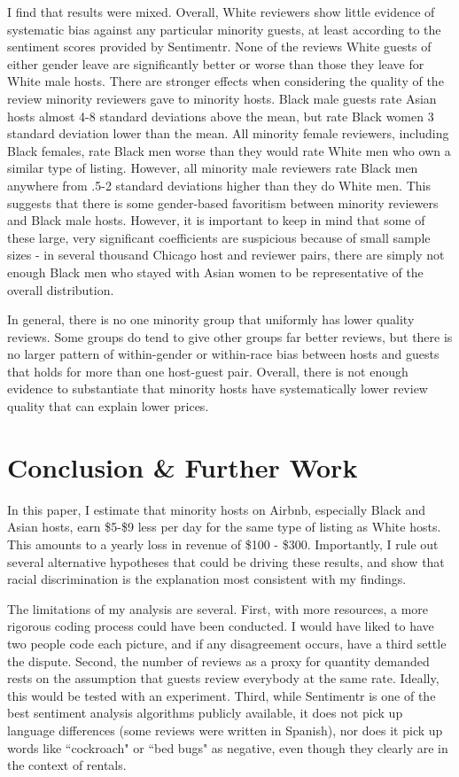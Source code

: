 \documentclass[11pt, oneside]{article}
\begin{document}
I find that results were mixed. Overall, White reviewers show little evidence of systematic bias against any particular minority guests, at least according to the sentiment scores provided by Sentimentr. None of the reviews White guests of either gender leave are significantly better or worse than those they leave for White male hosts. There are stronger effects when considering the quality of the review minority reviewers gave to minority hosts. Black male guests rate Asian hosts almost 4-8 standard deviations above the mean, but rate Black women 3 standard deviation lower than the mean. All minority female reviewers, including Black females, rate Black men worse than they would rate White men who own a similar type of listing. However, all minority male reviewers rate Black men anywhere from .5-2 standard deviations higher than they do White men. This suggests that there is some gender-based favoritism between minority reviewers and Black male hosts. However, it is important to keep in mind that some of these large, very significant coefficients are suspicious because of small sample sizes - in several thousand Chicago host and reviewer pairs, there are simply not enough Black men who stayed with Asian women to be representative of the overall distribution.

In general, there is no one minority group that uniformly has lower quality reviews. Some groups do tend to give other groups far better reviews, but there is no larger pattern of within-gender or within-race bias between hosts and guests that holds for more than one host-guest pair. Overall, there is not enough evidence to substantiate that minority hosts have systematically lower review quality that can explain lower prices. 



\section{Conclusion \& Further Work}

In this paper, I estimate that minority hosts on Airbnb, especially Black and Asian hosts, earn \$5-\$9 less per day for the same type of listing as White hosts. This amounts to a yearly loss in revenue of \$100 - \$300. Importantly, I rule out several alternative hypotheses that could be driving these results, and show that racial discrimination is the explanation most consistent with my findings. 

The limitations of my analysis are several. First, with more resources, a more rigorous coding process could have been conducted. I would have liked to have two people code each picture, and if any disagreement occurs, have a third settle the dispute. Second, the number of reviews as a proxy for quantity demanded rests on the assumption that guests review everybody at the same rate. Ideally, this would be tested with an experiment. Third, while Sentimentr is one of the best sentiment analysis algorithms publicly available, it does not pick up language differences (some reviews were written in Spanish), nor does it pick up words like ``cockroach" or ``bed bugs" as negative, even though they clearly are in the context of rentals.  
\end{document}
